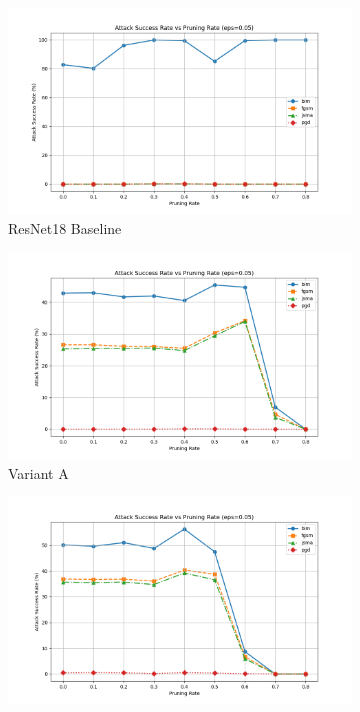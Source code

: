 \documentclass[preprint,12pt]{elsarticle}
\begin{document}
\begin{figure}[!t]
\begin{subfigure}[b]{0.24\columnwidth}
\centering
\includegraphics[width=\columnwidth]{fig/asr-prunning/chest_xray/0.05_resnet18.png}
\caption{ResNet18 Baseline}
\label{fig:asr_resnet18_005_b}
\end{subfigure}
\hfill
\begin{subfigure}[b]{0.24\columnwidth}
\centering
\includegraphics[width=\columnwidth]{fig/asr-prunning/chest_xray/0.05_no_afd_mfe_msf.png}
\caption{Variant A}
\label{fig:asr_no_afd_mfe_msf_005_b}
\end{subfigure}
\hfill
\begin{subfigure}[b]{0.24\columnwidth}
\centering
\includegraphics[width=\columnwidth]{fig/asr-prunning/chest_xray/0.05_no_afd_mfe.png}

\end{subfigure}
\end{figure}
\end{document}
